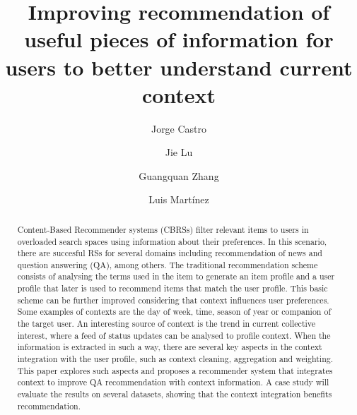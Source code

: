 \documentclass[preprint]{elsarticle}
\begin{document}
\title{Improving recommendation of useful pieces of information for users to better understand current context}

\begin{spacing}{1.5}

\begin{frontmatter}

\author[addressjorge,addressjie]{Jorge Castro}

\author[addressjie]{Jie Lu}

\author[addressjie]{Guangquan Zhang}

\author[addressluis]{Luis Mart\'inez}

\address[addressjorge]{Department of Computer Science and Artificial Intelligence, University of Granada, Granada (Spain)}
\address[addressjie]{School of Software, University of Technology Sydney, Sydney (Australia)}
\address[addressluis]{Computer Science Department, University of Ja\'en, Ja\'en (Spain)}

\begin{abstract}

Content-Based Recommender systems (CBRSs) filter relevant items to users in overloaded search spaces using information about their preferences. In this scenario, there are succesful RSs for several domains including recommendation of news and question answering (QA), among others. The traditional recommendation scheme consists of analysing the terms used in the item to generate an item profile and a user profile that later is used to recommend items that match the user profile. This basic scheme can be further improved considering that context influences user preferences. Some examples of contexts are the day of week, time, season of year or companion of the target user. An interesting source of context is the trend in current collective interest, where a feed of status updates can be analysed to profile context. When the information is extracted in such a way, there are several key aspects in the context integration with the user profile, such as context cleaning, aggregation and weighting. This paper explores such aspects and proposes a recommender system that integrates context to improve QA recommendation with context information. A case study will evaluate the results on several datasets, showing that the context integration benefits recommendation.


\end{abstract}
\end{frontmatter}
\end{spacing}
\end{document}
